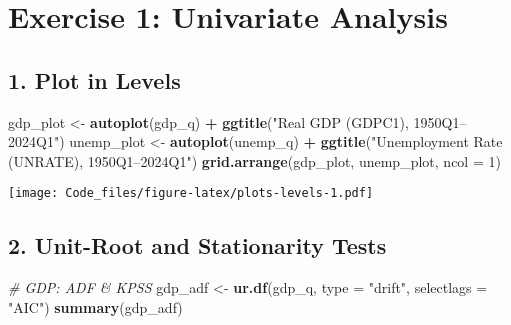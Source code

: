 \documentclass[
]{article}
\newenvironment{Shaded}{\begin{snugshade}}{\end{snugshade}}
\newcommand{\AttributeTok}[1]{\textcolor[rgb]{0.13,0.29,0.53}{#1}}
\newcommand{\CommentTok}[1]{\textcolor[rgb]{0.56,0.35,0.01}{\textit{#1}}}
\newcommand{\DecValTok}[1]{\textcolor[rgb]{0.00,0.00,0.81}{#1}}
\newcommand{\FunctionTok}[1]{\textcolor[rgb]{0.13,0.29,0.53}{\textbf{#1}}}
\newcommand{\NormalTok}[1]{#1}
\newcommand{\OtherTok}[1]{\textcolor[rgb]{0.56,0.35,0.01}{#1}}
\newcommand{\SpecialCharTok}[1]{\textcolor[rgb]{0.81,0.36,0.00}{\textbf{#1}}}
\newcommand{\StringTok}[1]{\textcolor[rgb]{0.31,0.60,0.02}{#1}}
\begin{document}
\hypertarget{exercise-1-univariate-analysis}{%
\section{Exercise 1: Univariate
Analysis}\label{exercise-1-univariate-analysis}}

\hypertarget{plot-in-levels}{%
\subsection{1. Plot in Levels}\label{plot-in-levels}}

\begin{Shaded}
\begin{Highlighting}[]
\NormalTok{gdp\_plot   }\OtherTok{\textless{}{-}} \FunctionTok{autoplot}\NormalTok{(gdp\_q)   }\SpecialCharTok{+} \FunctionTok{ggtitle}\NormalTok{(}\StringTok{"Real GDP (GDPC1), 1950Q1–2024Q1"}\NormalTok{)}
\NormalTok{unemp\_plot }\OtherTok{\textless{}{-}} \FunctionTok{autoplot}\NormalTok{(unemp\_q) }\SpecialCharTok{+} \FunctionTok{ggtitle}\NormalTok{(}\StringTok{"Unemployment Rate (UNRATE), 1950Q1–2024Q1"}\NormalTok{)}
\FunctionTok{grid.arrange}\NormalTok{(gdp\_plot, unemp\_plot, }\AttributeTok{ncol =} \DecValTok{1}\NormalTok{)}
\end{Highlighting}
\end{Shaded}

\texttt{[image: Code\_files/figure-latex/plots-levels-1.pdf]}

\hypertarget{unit-root-and-stationarity-tests}{%
\subsection{2. Unit-Root and Stationarity
Tests}\label{unit-root-and-stationarity-tests}}

\begin{Shaded}
\begin{Highlighting}[]
\CommentTok{\# GDP: ADF \& KPSS}
\NormalTok{gdp\_adf  }\OtherTok{\textless{}{-}} \FunctionTok{ur.df}\NormalTok{(gdp\_q,  }\AttributeTok{type =} \StringTok{"drift"}\NormalTok{, }\AttributeTok{selectlags =} \StringTok{"AIC"}\NormalTok{)}
\FunctionTok{summary}\NormalTok{(gdp\_adf)}
\end{Highlighting}
\end{Shaded}
\end{document}
